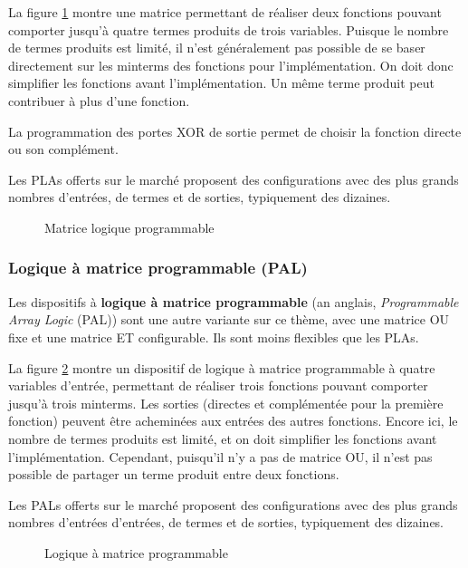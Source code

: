 \documentclass[11pt]{article}
\begin{document}
La figure \ref{fig:org6f937a3} montre une matrice permettant de
réaliser deux fonctions pouvant comporter jusqu'à quatre termes
produits de trois variables. Puisque le nombre de termes produits est
limité, il n'est généralement pas possible de se baser directement sur
les minterms des fonctions pour l'implémentation. On doit donc
simplifier les fonctions avant l'implémentation. Un même terme produit
peut contribuer à plus d'une fonction.

La programmation des portes XOR de sortie permet de choisir
la fonction directe ou son complément. 

Les PLAs offerts sur le marché proposent des configurations avec des
plus grands nombres d'entrées, de termes et de sorties, typiquement
des dizaines.

\begin{figure}[htbp]
\centering

\caption{\label{fig:org6f937a3}Matrice logique programmable}
\end{figure}

\subsubsection{Logique à matrice programmable (PAL)}
\label{sec:orge7643e2}

Les dispositifs à \textbf{logique à matrice programmable} (an anglais,
\emph{Programmable Array Logic} (PAL)) sont une autre variante sur ce
thème, avec une matrice OU fixe et une matrice ET configurable. Ils
sont moins flexibles que les PLAs.

La figure \ref{fig:org2517b0d} montre un dispositif de logique à matrice
programmable à quatre variables d'entrée, permettant de réaliser trois
fonctions pouvant comporter jusqu'à trois minterms. Les sorties
(directes et complémentée pour la première fonction) peuvent être
acheminées aux entrées des autres fonctions. Encore ici, le nombre de
termes produits est limité, et on doit simplifier les fonctions avant
l'implémentation. Cependant, puisqu'il n'y a pas de matrice OU, il
n'est pas possible de partager un terme produit entre deux fonctions.

Les PALs offerts sur le marché proposent des configurations avec des
plus grands nombres d'entrées d'entrées, de termes et de sorties,
typiquement des dizaines.


\begin{figure}[htbp]
\centering

\caption{\label{fig:org2517b0d}Logique à matrice programmable}
\end{figure}
\end{document}
